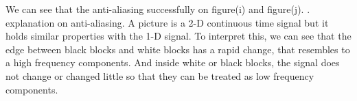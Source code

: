 \documentclass[12pt,a4paper]{article}
\begin{document}
\begin{figure}[H]
    \centering  %
\end{figure}
We can see that the anti-aliasing successfully on figure(i) and figure(j).
. explanation on anti-aliasing.
A picture is a 2-D continuous time signal but it holds similar properties with the 1-D signal.
To interpret this, we can see that the edge between black blocks and white blocks has a rapid
change, that resembles to a high frequency components. And inside white or black blocks, the signal 
does not change or changed little so that they can be treated as low frequency components. \par
\end{document}
